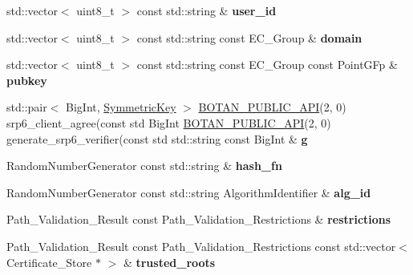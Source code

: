 \begin{DoxyCompactItemize}
\item 
\mbox{\label{namespace_botan_ad2ba6ed9adbd3daad55a7771f7f1c916}} 
std\+::vector$<$ uint8\+\_\+t $>$ const std\+::string \& {\bfseries user\+\_\+id}
\item 
\mbox{\label{namespace_botan_a4dc2a26cd893245cca609c658abf95dd}} 
std\+::vector$<$ uint8\+\_\+t $>$ const std\+::string const E\+C\+\_\+\+Group \& {\bfseries domain}
\item 
\mbox{\label{namespace_botan_a1e6b17ab6587a6e31b6e899c04acb987}} 
std\+::vector$<$ uint8\+\_\+t $>$ const std\+::string const E\+C\+\_\+\+Group const Point\+G\+Fp \& {\bfseries pubkey}
\item 
\mbox{\label{namespace_botan_a97c23440dccec1583013c44d5bf44ce2}} 
std\+::pair$<$ Big\+Int, \hyperlink{namespace_botan_a89cf6c3513428f524454d01830221a88}{Symmetric\+Key} $>$ \hyperlink{namespace_botan_a6b9388030d872e586a4655b776ac9501}{B\+O\+T\+A\+N\+\_\+\+P\+U\+B\+L\+I\+C\+\_\+\+A\+PI}(2, 0) srp6\+\_\+client\+\_\+agree(const std Big\+Int \hyperlink{namespace_botan_a6b9388030d872e586a4655b776ac9501}{B\+O\+T\+A\+N\+\_\+\+P\+U\+B\+L\+I\+C\+\_\+\+A\+PI}(2, 0) generate\+\_\+srp6\+\_\+verifier(const std std\+::string const Big\+Int \& {\bfseries g}
\item 
\mbox{\label{namespace_botan_ac6ff3a76d5b1d104c0df37360f18cb83}} 
Random\+Number\+Generator const std\+::string \& {\bfseries hash\+\_\+fn}
\item 
\mbox{\label{namespace_botan_ad140168efb52a67d1d1808860e679357}} 
Random\+Number\+Generator const std\+::string Algorithm\+Identifier \& {\bfseries alg\+\_\+id}
\item 
\mbox{\label{namespace_botan_a87b96fedb23b4218373cfd0a749036d7}} 
Path\+\_\+\+Validation\+\_\+\+Result const Path\+\_\+\+Validation\+\_\+\+Restrictions \& {\bfseries restrictions}
\item 
\mbox{\label{namespace_botan_a7b6d085f658cc3ceaf8ef66561b44be3}} 
Path\+\_\+\+Validation\+\_\+\+Result const Path\+\_\+\+Validation\+\_\+\+Restrictions const std\+::vector$<$ Certificate\+\_\+\+Store $\ast$ $>$ \& {\bfseries trusted\+\_\+roots}

\end{DoxyCompactItemize}
